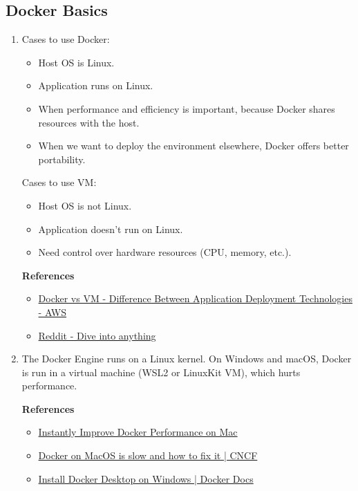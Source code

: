 \documentclass[12pt, a4paper]{article}
\begin{document}
  \subsection*{Docker Basics}
  \begin{enumerate}[resume]
    \item Cases to use Docker:
    \begin{itemize}
      \item Host OS is Linux.
      \item Application runs on Linux.
      \item When performance and efficiency is important, because Docker shares
      resources with the host.
      \item When we want to deploy the environment elsewhere, Docker offers better portability.
    \end{itemize}

    Cases to use VM:
    \begin{itemize}
      \item Host OS is not Linux.
      \item Application doesn't run on Linux.
      \item Need control over hardware resources (CPU, memory, etc.).
    \end{itemize}

    \textbf{References}
    \begin{itemize}
      \item \href{https://aws.amazon.com/compare/the-difference-between-docker-vm/}{Docker vs VM - Difference Between Application Deployment Technologies - AWS}
      \item \href{https://www.reddit.com/r/docker/comments/q6ykxa/when_should_you_choose_vms_over_docker/}{Reddit - Dive into anything}
    \end{itemize}

    \item The Docker Engine runs on a Linux kernel. On Windows and macOS, Docker
    is run in a virtual machine (WSL2 or LinuxKit VM), which hurts performance.

    \textbf{References}
    \begin{itemize}
      \item \href{https://www.usenimbus.com/post/instantly-improve-docker-performance-on-mac}{Instantly Improve Docker Performance on Mac}
      \item \href{https://www.cncf.io/blog/2023/02/02/docker-on-macos-is-slow-and-how-to-fix-it/}{Docker on MacOS is slow and how to fix it | CNCF}
      \item \href{https://docs.docker.com/desktop/install/windows-install/}{Install Docker Desktop on Windows | Docker Docs}
    \end{itemize}


\end{enumerate}
\end{document}
